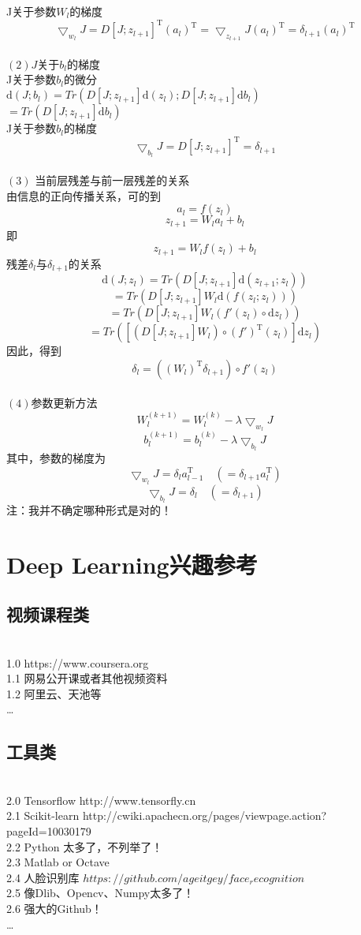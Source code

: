 \documentclass[UFT8]{ctexart}
\begin{document}
J关于参数$W_{l}$的梯度
\[ \bigtriangledown_{w_{l}}J = D[J;z_{l+1}]^\mathrm{T}(a_{l})^\mathrm{T} = \bigtriangledown_{z_{l+1}}J(a_{l})^\mathrm{T} = \delta_{l+1}(a_{l})^\mathrm{T}\]
~\\
$(2) J$关于$b_{l}$的梯度 \\
J关于参数$b_{l}$的微分\\
$\mathrm{d}(J;b_{l}) = Tr(D[J;z_{l+1}]\mathrm{d}(z_{l});D[J;z_{l+1}]\mathrm{d}b_{l})$ \\
$ = Tr(D[J;z_{l+1}]\mathrm{d} b_{l})$ \\
J关于参数$b_{l}$的梯度
\[ \bigtriangledown_{b_{l}}J = D[J;z_{l+1}]^\mathrm{T} = \delta_{l+1} \]
~\\
$(3)$ 当前层残差与前一层残差的关系 \\
由信息的正向传播关系，可的到
\[ a_{l} = f(z_{l}) \] 
\[ z_{l+1} = W_{l}a_{l} + b_{l} \] 
即 
\[ z_{l+1} = W_{l}f(z_{l}) + b_{l} \]  
残差$\delta_{l}$与$\delta_{l+1}$的关系  
\[ \mathrm{d}(J;z_{l}) = Tr(D[J;z_{l+1}]\mathrm{d}(z_{l+1};z_{l})) \]
\[ = Tr(D[J;z_{l+1}]W_{l}\mathrm{d}(f(z_{l};z_{l}))) \]
\[ = Tr(D[J;z_{l+1}]W_{l}(f'(z_{l}) \circ \mathrm{d}z_{l})) \]
\[ = Tr([(D[J;z_{l+1}]W_{l}) \circ (f')^\mathrm{T}(z_{l})]\mathrm{d}z_{l}) \]
因此，得到
\[ \delta_{l} = ((W_{l})^\mathrm{T}\delta_{l+1}) \circ f'(z_{l}) \] 
~\\
$(4)$参数更新方法 \\
\[ W_{l}^{(k+1)} = W_{l}^{(k)} - \lambda \bigtriangledown_{w_{l}}J \]
\[ b_{l}^{(k+1)} = b_{l}^{(k)} - \lambda \bigtriangledown_{b_{l}}J \]
其中，参数的梯度为
\[ \bigtriangledown_{w_{l}}J = \delta_{l}a_{l-1}^\mathrm{T}  \quad ( = \delta_{l+1}a_{l}^\mathrm{T} ) \]  
\[ \bigtriangledown_{b_{l}}J = \delta_{l} \quad ( = \delta_{l+1} ) \]
注：我并不确定哪种形式是对的！
\newpage
\section{Deep Learning兴趣参考}
\subsection{视频课程类}
~\\
1.0	https://www.coursera.org \\
1.1	网易公开课或者其他视频资料\\
1.2	阿里云、天池等\\
\ldots
~\\
\subsection{工具类 }
~\\
2.0 	Tensorflow http://www.tensorfly.cn\\
2.1	Scikit-learn http://cwiki.apachecn.org/pages/viewpage.action?pageId=10030179\\
2.2	Python 太多了，不列举了！\\
2.3	Matlab or Octave \\
2.4	人脸识别库 $https://github.com/ageitgey/face_recognition$\\
2.5	像Dlib、Opencv、Numpy太多了！\\
2.6	强大的Github！\\
\ldots
~\\
\end{document}
